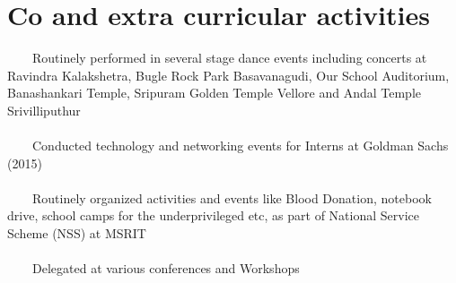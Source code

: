 \documentclass[a4paper,10pt]{article} %
\newcommand{\tabitem}{~~\llap{\textbullet}~~}
\begin{document}

\section{Co and extra curricular activities}
\tabitem Routinely performed in several stage dance events including concerts at Ravindra Kalakshetra, Bugle Rock Park Basavanagudi, Our School Auditorium, Banashankari Temple, Sripuram Golden Temple Vellore and Andal Temple Srivilliputhur\\
\\
\tabitem Conducted technology and networking events for Interns at Goldman Sachs (2015)\\
\\
\tabitem Routinely organized activities and events like Blood Donation, notebook drive, school camps for the underprivileged etc, as part of National Service Scheme (NSS) at MSRIT\\
\\ 
\tabitem Delegated at various conferences and Workshops\\
\\


\end{document}
